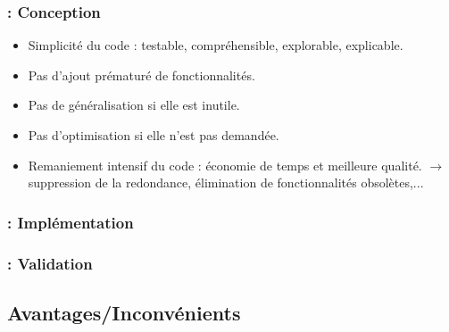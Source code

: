 \begin{frame}
\frametitle{\insertsubsection : Conception}
\begin{itemize}
\item Simplicité du code : testable, compréhensible, explorable, explicable.
\item Pas d'ajout prématuré de fonctionnalités.
\item Pas de généralisation si elle est inutile.
\item Pas d'optimisation si elle n'est pas demandée.
\item Remaniement intensif du code : économie de temps et meilleure qualité. $\rightarrow$ suppression de la redondance, élimination de fonctionnalités obsolètes,...
\end{itemize}
\end{frame}

\begin{frame}
\frametitle{\insertsubsection : Implémentation}

\end{frame}

\begin{frame}
\frametitle{\insertsubsection : Validation}

\end{frame}

\subsection{Avantages/Inconvénients}
\begin{frame}
\frametitle{\insertsubsection}
\end{frame}
